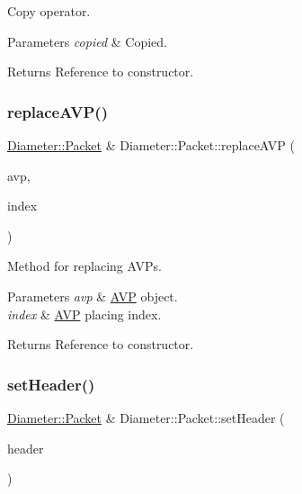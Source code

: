 Copy operator. 


\begin{DoxyParams}{Parameters}
{\em copied} & Copied. \\
\hline
\end{DoxyParams}
\begin{DoxyReturn}{Returns}
Reference to constructor. 
\end{DoxyReturn}
\mbox{\label{classDiameter_1_1Packet_afc303623a41f1bc454dfe6b711c47c33}} 
\subsubsection{\texorpdfstring{replace\+A\+V\+P()}{replaceAVP()}}
{\footnotesize\ttfamily \hyperlink{classDiameter_1_1Packet}{Diameter\+::\+Packet} \& Diameter\+::\+Packet\+::replace\+A\+VP (\begin{DoxyParamCaption}\item[{\hyperlink{classDiameter_1_1AVP}{Diameter\+::\+A\+VP}}]{avp,  }\item[{uint32\+\_\+t}]{index }\end{DoxyParamCaption})}



Method for replacing A\+V\+Ps. 


\begin{DoxyParams}{Parameters}
{\em avp} & \hyperlink{classDiameter_1_1AVP}{A\+VP} object. \\
\hline
{\em index} & \hyperlink{classDiameter_1_1AVP}{A\+VP} placing index. \\
\hline
\end{DoxyParams}
\begin{DoxyReturn}{Returns}
Reference to constructor. 
\end{DoxyReturn}
\mbox{\label{classDiameter_1_1Packet_ac37c0f3736cc87e553ecb7b60e6962b2}} 
\subsubsection{\texorpdfstring{set\+Header()}{setHeader()}}
{\footnotesize\ttfamily \hyperlink{classDiameter_1_1Packet}{Diameter\+::\+Packet} \& Diameter\+::\+Packet\+::set\+Header (\begin{DoxyParamCaption}\item[{\hyperlink{classDiameter_1_1Packet_1_1Header}{Header}}]{header }\end{DoxyParamCaption})}



